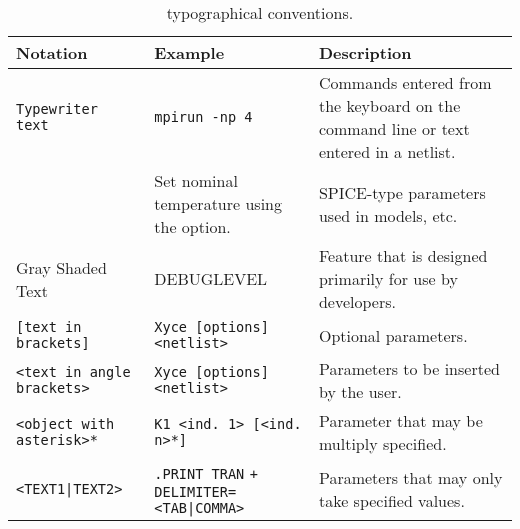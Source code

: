 \begin{table}[htbp]
    \caption{\Xyce{} typographical conventions.}\label{typog}
  \begin{tabularx}{\linewidth}{|Y|Y|Y|}
     \color{white}\bf Notation & \color{white}\bf
    Example & \color{white}\bf Description \\ \hline

    \texttt{Typewriter text} & \texttt{mpirun -np 4}
    & Commands entered
    from the keyboard on the command line or text entered in a netlist. \\
    \hline

     & Set nominal temperature using the
     option. & SPICE-type parameters used in models, etc. \\
    \hline

     Gray Shaded Text &  DEBUGLEVEL
    & Feature that is designed primarily for use by \Xyce{}
    developers. \\ \hline

    \texttt{[text in brackets]} & \texttt{Xyce [options] <netlist>} & Optional parameters. \\ \hline

    \texttt{<text in angle brackets>} & \texttt{Xyce [options] <netlist>} &
    Parameters to be inserted by the user. \\ \hline

    \texttt{<object with asterisk>*} & \texttt{K1 <ind. 1> [<ind. n>*]} &
    Parameter that may be multiply specified. \\ \hline

    \texttt{<TEXT1|TEXT2>}&
    \texttt{.PRINT TRAN}
    \verb-+     DELIMITER=<TAB|COMMA>- & Parameters that may only take specified values. \\ \hline

  \end{tabularx}
\end{table}
